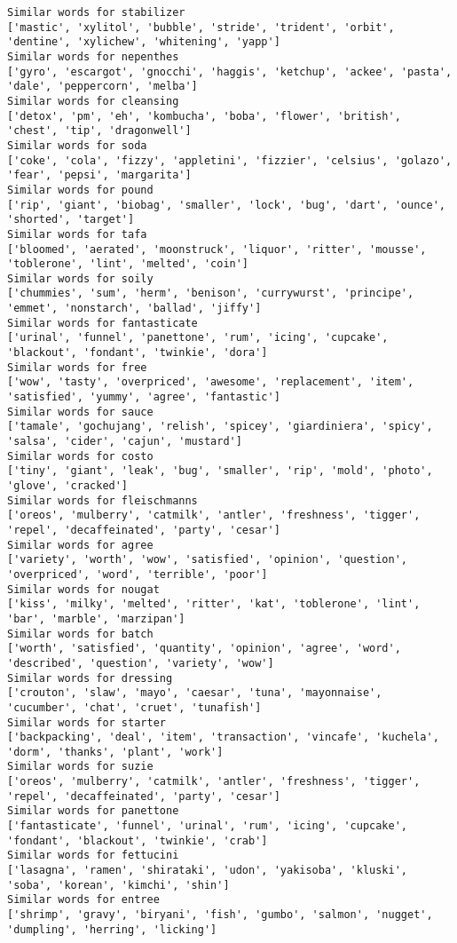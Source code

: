 \documentclass[11pt]{article}
\begin{document}
\begin{Verbatim}[commandchars=\\\{\}]
Similar words for stabilizer
['mastic', 'xylitol', 'bubble', 'stride', 'trident', 'orbit', 'dentine', 'xylichew', 'whitening', 'yapp']
Similar words for nepenthes
['gyro', 'escargot', 'gnocchi', 'haggis', 'ketchup', 'ackee', 'pasta', 'dale', 'peppercorn', 'melba']
Similar words for cleansing
['detox', 'pm', 'eh', 'kombucha', 'boba', 'flower', 'british', 'chest', 'tip', 'dragonwell']
Similar words for soda
['coke', 'cola', 'fizzy', 'appletini', 'fizzier', 'celsius', 'golazo', 'fear', 'pepsi', 'margarita']
Similar words for pound
['rip', 'giant', 'biobag', 'smaller', 'lock', 'bug', 'dart', 'ounce', 'shorted', 'target']
Similar words for tafa
['bloomed', 'aerated', 'moonstruck', 'liquor', 'ritter', 'mousse', 'toblerone', 'lint', 'melted', 'coin']
Similar words for soily
['chummies', 'sum', 'herm', 'benison', 'currywurst', 'principe', 'emmet', 'nonstarch', 'ballad', 'jiffy']
Similar words for fantasticate
['urinal', 'funnel', 'panettone', 'rum', 'icing', 'cupcake', 'blackout', 'fondant', 'twinkie', 'dora']
Similar words for free
['wow', 'tasty', 'overpriced', 'awesome', 'replacement', 'item', 'satisfied', 'yummy', 'agree', 'fantastic']
Similar words for sauce
['tamale', 'gochujang', 'relish', 'spicey', 'giardiniera', 'spicy', 'salsa', 'cider', 'cajun', 'mustard']
Similar words for costo
['tiny', 'giant', 'leak', 'bug', 'smaller', 'rip', 'mold', 'photo', 'glove', 'cracked']
Similar words for fleischmanns
['oreos', 'mulberry', 'catmilk', 'antler', 'freshness', 'tigger', 'repel', 'decaffeinated', 'party', 'cesar']
Similar words for agree
['variety', 'worth', 'wow', 'satisfied', 'opinion', 'question', 'overpriced', 'word', 'terrible', 'poor']
Similar words for nougat
['kiss', 'milky', 'melted', 'ritter', 'kat', 'toblerone', 'lint', 'bar', 'marble', 'marzipan']
Similar words for batch
['worth', 'satisfied', 'quantity', 'opinion', 'agree', 'word', 'described', 'question', 'variety', 'wow']
Similar words for dressing
['crouton', 'slaw', 'mayo', 'caesar', 'tuna', 'mayonnaise', 'cucumber', 'chat', 'cruet', 'tunafish']
Similar words for starter
['backpacking', 'deal', 'item', 'transaction', 'vincafe', 'kuchela', 'dorm', 'thanks', 'plant', 'work']
Similar words for suzie
['oreos', 'mulberry', 'catmilk', 'antler', 'freshness', 'tigger', 'repel', 'decaffeinated', 'party', 'cesar']
Similar words for panettone
['fantasticate', 'funnel', 'urinal', 'rum', 'icing', 'cupcake', 'fondant', 'blackout', 'twinkie', 'crab']
Similar words for fettucini
['lasagna', 'ramen', 'shirataki', 'udon', 'yakisoba', 'kluski', 'soba', 'korean', 'kimchi', 'shin']
Similar words for entree
['shrimp', 'gravy', 'biryani', 'fish', 'gumbo', 'salmon', 'nugget', 'dumpling', 'herring', 'licking']

\end{Verbatim}
\end{document}
